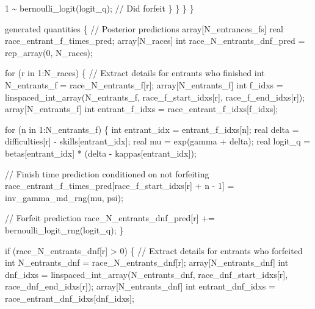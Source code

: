 \documentclass[
  letterpaper,
  DIV=11,
  numbers=noendperiod]{scrartcl}
\newenvironment{Shaded}{\begin{snugshade}}{\end{snugshade}}
\newcommand{\CommentTok}[1]{\textcolor[rgb]{0.37,0.37,0.37}{#1}}
\newcommand{\ControlFlowTok}[1]{\textcolor[rgb]{0.00,0.23,0.31}{#1}}
\newcommand{\DataTypeTok}[1]{\textcolor[rgb]{0.68,0.00,0.00}{#1}}
\newcommand{\DecValTok}[1]{\textcolor[rgb]{0.68,0.00,0.00}{#1}}
\newcommand{\KeywordTok}[1]{\textcolor[rgb]{0.00,0.23,0.31}{#1}}
\newcommand{\NormalTok}[1]{\textcolor[rgb]{0.00,0.23,0.31}{#1}}
\begin{document}
\begin{codelisting}
\begin{Shaded}
\begin{Highlighting}[]
        \DecValTok{1}\NormalTok{ \textasciitilde{} bernoulli\_logit(logit\_q); }\CommentTok{// Did forfeit}
\NormalTok{      \}}
\NormalTok{    \}}
\NormalTok{  \}}
\NormalTok{\}}

\KeywordTok{generated quantities}\NormalTok{ \{}
  \CommentTok{// Posterior predictions}
  \DataTypeTok{array}\NormalTok{[N\_entrances\_fs] }\DataTypeTok{real}\NormalTok{ race\_entrant\_f\_times\_pred;}
  \DataTypeTok{array}\NormalTok{[N\_races] }\DataTypeTok{int}\NormalTok{ race\_N\_entrants\_dnf\_pred = rep\_array(}\DecValTok{0}\NormalTok{, N\_races);}

  \ControlFlowTok{for}\NormalTok{ (r }\ControlFlowTok{in} \DecValTok{1}\NormalTok{:N\_races) \{}
    \CommentTok{// Extract details for entrants who finished}
    \DataTypeTok{int}\NormalTok{ N\_entrants\_f = race\_N\_entrants\_f[r];}
    \DataTypeTok{array}\NormalTok{[N\_entrants\_f] }\DataTypeTok{int}\NormalTok{ f\_idxs = linspaced\_int\_array(N\_entrants\_f,}
\NormalTok{                                                         race\_f\_start\_idxs[r],}
\NormalTok{                                                         race\_f\_end\_idxs[r]);}
    \DataTypeTok{array}\NormalTok{[N\_entrants\_f] }\DataTypeTok{int}\NormalTok{ entrant\_f\_idxs = race\_entrant\_f\_idxs[f\_idxs];}

    \ControlFlowTok{for}\NormalTok{ (n }\ControlFlowTok{in} \DecValTok{1}\NormalTok{:N\_entrants\_f) \{}
      \DataTypeTok{int}\NormalTok{ entrant\_idx = entrant\_f\_idxs[n];}
      \DataTypeTok{real}\NormalTok{ delta = difficulties[r] {-} skills[entrant\_idx];}
      \DataTypeTok{real}\NormalTok{ mu = exp(gamma + delta);}
      \DataTypeTok{real}\NormalTok{ logit\_q = betas[entrant\_idx] * (delta {-} kappas[entrant\_idx]);}

      \CommentTok{// Finish time prediction conditioned on not forfeiting}
\NormalTok{      race\_entrant\_f\_times\_pred[race\_f\_start\_idxs[r] + n {-} }\DecValTok{1}\NormalTok{]}
\NormalTok{        = inv\_gamma\_md\_rng(mu, psi);}

      \CommentTok{// Forfeit prediction}
\NormalTok{      race\_N\_entrants\_dnf\_pred[r] += bernoulli\_logit\_rng(logit\_q);}
\NormalTok{    \}}

    \ControlFlowTok{if}\NormalTok{ (race\_N\_entrants\_dnf[r] \textgreater{} }\DecValTok{0}\NormalTok{) \{}
      \CommentTok{// Extract details for entrants who forfeited}
      \DataTypeTok{int}\NormalTok{ N\_entrants\_dnf = race\_N\_entrants\_dnf[r];}
      \DataTypeTok{array}\NormalTok{[N\_entrants\_dnf]}
        \DataTypeTok{int}\NormalTok{ dnf\_idxs = linspaced\_int\_array(N\_entrants\_dnf,}
\NormalTok{                                           race\_dnf\_start\_idxs[r],}
\NormalTok{                                           race\_dnf\_end\_idxs[r]);}
      \DataTypeTok{array}\NormalTok{[N\_entrants\_dnf]}
        \DataTypeTok{int}\NormalTok{ entrant\_dnf\_idxs = race\_entrant\_dnf\_idxs[dnf\_idxs];}


\end{Highlighting}
\end{Shaded}
\end{codelisting}
\end{document}
